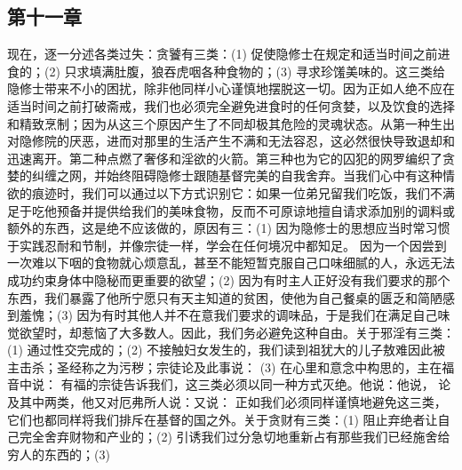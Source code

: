 
\subsection{第十一章}

\par

现在，逐一分述各类过失：贪饕有三类：(1) 促使隐修士在规定和适当时间之前进食的；(2) 只求填满肚腹，狼吞虎咽各种食物的；(3) 寻求珍馐美味的。这三类给隐修士带来不小的困扰，除非他同样小心谨慎地摆脱这一切。因为正如人绝不应在适当时间之前打破斋戒，我们也必须完全避免进食时的任何贪婪，以及饮食的选择和精致烹制；因为从这三个原因产生了不同却极其危险的灵魂状态。从第一种生出对隐修院的厌恶，进而对那里的生活产生不满和无法容忍，这必然很快导致退却和迅速离开。第二种点燃了奢侈和淫欲的火箭。第三种也为它的囚犯的网罗编织了贪婪的纠缠之网，并始终阻碍隐修士跟随基督完美的自我舍弃。当我们心中有这种情欲的痕迹时，我们可以通过以下方式识别它：如果一位弟兄留我们吃饭，我们不满足于吃他预备并提供给我们的美味食物，反而不可原谅地擅自请求添加别的调料或额外的东西，这是绝不应该做的，原因有三：(1) 因为隐修士的思想应当时常习惯于实践忍耐和节制，并像宗徒一样，学会在任何境况中都知足。 因为一个因尝到一次难以下咽的食物就心烦意乱，甚至不能短暂克服自己口味细腻的人，永远无法成功约束身体中隐秘而更重要的欲望；(2) 因为有时主人正好没有我们要求的那个东西，我们暴露了他所宁愿只有天主知道的贫困，使他为自己餐桌的匮乏和简陋感到羞愧；(3) 因为有时其他人并不在意我们要求的调味品，于是我们在满足自己味觉欲望时，却惹恼了大多数人。因此，我们务必避免这种自由。关于邪淫有三类：(1) 通过性交完成的；(2) 不接触妇女发生的，我们读到祖犹大的儿子敖难因此被主击杀；圣经称之为污秽；宗徒论及此事说： (3) 在心里和意念中构思的，主在福音中说： 有福的宗徒告诉我们，这三类必须以同一种方式灭绝。他说：他说， 论及其中两类，他又对厄弗所人说：又说： 正如我们必须同样谨慎地避免这三类，它们也都同样将我们排斥在基督的国之外。关于贪财有三类：(1) 阻止弃绝者让自己完全舍弃财物和产业的；(2) 引诱我们过分急切地重新占有那些我们已经施舍给穷人的东西的；(3) 